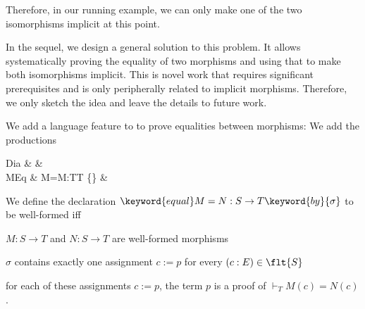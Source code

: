 Therefore, in our running example, we can only make one of the two isomorphisms implicit at this point.

In the sequel, we design a general solution to this problem.
It allows systematically proving the equality of two morphisms and using that to make both isomorphisms implicit.
This is novel work that requires significant prerequisites and is only peripherally related to implicit morphisms.
Therefore, we only sketch the idea and leave the details to future work.

We add a language feature to \mmt to prove equalities between morphisms:
We add the productions
\begin{grammar}
Dia   &   &\\
MEq   &  M=M:T\to T  \{\} &\\
\end{grammar}


We define the declaration $\keyword{equal} M=N:S\to T \keyword{by} \{\sigma\}$ to be well-formed iff
\begin{compactitem} 
  \item $M:S\to T$ and $N:S\to T$ are well-formed morphisms
  \item $\sigma$ contains exactly one assignment $c:=p$ for every $(c:E)\in\flt{S}$
  \item for each of these assignments $c:=p$, the term $p$ is a proof of $\vdash_T M(c)=N(c)$.
\end{compactitem}

